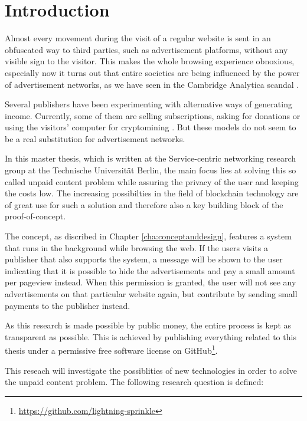 \chapter{Introduction}
\label{cha:introduction}

 Almost every movement during the visit of a regular website is sent in an obfuscated way to third parties, such as advertisement platforms, without any visible sign to the visitor. This makes the whole browsing experience obnoxious, especially now it turns out that entire societies are being influenced by the power of advertisement networks, as we have seen in the Cambridge Analytica scandal \cite{cadwalladr2018cambridge}.

Several publishers have been experimenting with alternative ways of generating income. Currently, some of them are selling subscriptions, asking for donations or using the visitors' computer for cryptomining \cite{ruth2018digging}. But these models do not seem to be a real substitution for advertisement networks. 

In this master thesis, which is written at the Service-centric networking research group at the Technische Universität Berlin, the main focus lies at solving this so called unpaid content problem while assuring the privacy of the user and keeping the costs low. The increasing possibilties in the field of blockchain technology are of great use for such a solution and therefore also a key building block of the proof-of-concept.

The concept, as discribed in Chapter \ref{cha:conceptanddesign}, features a system that runs in the background while browsing the web. If the users visits a publisher that also supports the system, a message will be shown to the user indicating that it is possible to hide the advertisements and pay a small amount per pageview instead. When this permission is granted, the user will not see any advertisements on that particular website again, but contribute by sending small payments to the publisher instead.

As this research is made possible by public money, the entire process is kept as transparent as possible. This is achieved by publishing everything related to this thesis under a permissive free software license on GitHub\footnote{\url{https://github.com/lightning-sprinkle}}.

This reseach will investigate the possiblities of new technologies in order to solve the unpaid content problem. The following research question is defined:
\vspace{1em}

